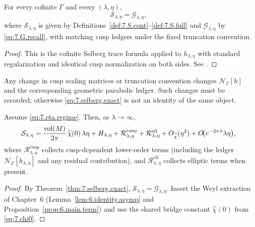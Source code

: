 \begin{theorem}\label{thm:7.selberg.exact}
For every cofinite $\Gamma$ and every $(\lambda,\eta)$,
\begin{equation}\label{eq:7.selberg.exact}
\mathcal S_{\lambda,\eta}=\mathcal G_{\lambda,\eta},
\end{equation}
where $\mathcal S_{\lambda,\eta}$ is given by Definitions~\ref{def:7.S.cont}--\ref{def:7.S.full} and
$\mathcal G_{\lambda,\eta}$ by \eqref{eq:7.G.recall}, with matching cusp ledgers under the fixed truncation convention.
\end{theorem}

\begin{proof}
This is the cofinite Selberg trace formula applied to $h_{\lambda,\eta}$ with standard regularization and identical cusp normalization
on both sides. See \cite{Selberg1956,Hejhal1983,Iwaniec2002}.
\end{proof}

\begin{remark}\label{rem:7.ledger.not.optional}
Any change in cusp scaling matrices or truncation convention changes $\mathcal N_\Gamma[h]$ and the corresponding geometric
parabolic ledger. Such changes must be recorded; otherwise \eqref{eq:7.selberg.exact} is not an identity of the same object.
\end{remark}

\begin{theorem}\label{thm:7.weyl.main}
Assume \eqref{eq:7.eta.regime}. Then, as $\lambda\to\infty$,
\begin{equation}\label{eq:7.weyl.main}
\mathcal S_{\lambda,\eta}
=\frac{\mathop{\mathrm{vol}}\nolimits(M)}{2\pi}\,\widehat\chi(0)\,\lambda\eta
+H_{\lambda,\eta}
+\mathcal R^{\mathrm{cusp}}_{\lambda,\eta}
+\mathcal R^{\mathrm{ell}}_{\lambda,\eta}
+O_{\widehat\chi}(\eta^2)
+O\!\big(e^{-2\pi\lambda}\lambda\eta\big),
\end{equation}
where $\mathcal R^{\mathrm{cusp}}_{\lambda,\eta}$ collects cusp-dependent lower-order terms (including the ledger $\mathcal N_\Gamma[h_{\lambda,\eta}]$
and any residual contribution), and $\mathcal R^{\mathrm{ell}}_{\lambda,\eta}$ collects elliptic terms when present.
\end{theorem}

\begin{proof}
By Theorem~\ref{thm:7.selberg.exact}, $\mathcal S_{\lambda,\eta}=\mathcal G_{\lambda,\eta}$.
Insert the Weyl extraction of Chapter~6 (Lemma~\ref{lem:6.identity.asymp} and Proposition~\ref{prop:6.main.term})
and use the shared bridge constant $\widehat\chi(0)$ from \eqref{eq:7.chi0}.
\end{proof}

